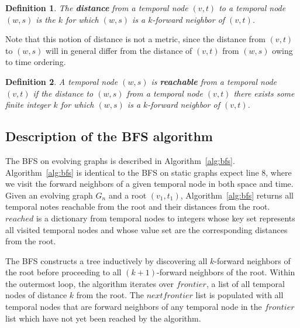\documentclass[10pt,conference,compsocconf]{IEEEtran}
\newtheorem{defn}{Definition}
\theoremstyle{definition}
\begin{document}
\begin{defn}
The \textbf{distance} from a temporal node $(v, t)$ to a temporal node $(w, s)$ is
the $k$ for which $(w, s)$ is a $k$-forward neighbor of $(v, t)$.
\end{defn}

Note that this notion of distance is not a metric, since the distance from $(v, t)$
to $(w, s)$ will in general differ from the distance of $(v, t)$ from $(w, s)$
owing to time ordering.


\begin{defn}
A temporal node $(w, s)$ is \textbf{reachable} from a temporal node $(v, t)$ if
the distance to $(w, s)$ from a temporal node $(v, t)$ there exists some finite
integer $k$ for which $(w, s)$ is a $k$-forward neighbor of $(v, t)$.
\end{defn}

\subsection{Description of the BFS algorithm}
\label{sec:descr-algor}

The BFS on evolving graphs is described in Algorithm~\ref{alg:bfs}.
Algorithm~\ref{alg:bfs} is identical to the BFS on static graphs expect 
line $8$, where we visit the forward neighbors of a given temporal node
in both space and time.
Given an evolving graph $G_n$ and a root $(v_1, t_1)$,
Algorithm~\ref{alg:bfs} returns all temporal notes reachable from the root and
their distances from the root.
$reached$ is a dictionary from temporal nodes to integers whose key set represents
all visited temporal nodes and whose value set are the corresponding distances
from the root.

The BFS constructs a tree inductively by discovering all $k$-forward neighbors
of the root before proceeding to all $(k+1)$-forward neighbors of the root.
Within the outermost loop, the algorithm iterates over $frontier$, a list of all
temporal nodes of distance $k$ from the root. The $nextfrontier$ list is populated
with all temporal nodes that are forward neighbors of any temporal node in the
$frontier$ list which have not yet been reached by the algorithm.
\end{document}
